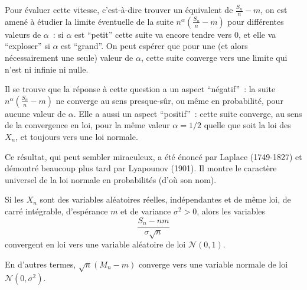 Pour évaluer cette vitesse, c'est-à-dire trouver un équivalent de
\(\frac{S_n}{n} - m\), on est amené à étudier la limite éventuelle de la
suite \(n^\alpha (\frac{S_n}{n} - m)\) pour différentes valeurs de
\(\alpha\)~: si \(\alpha\) est ``petit'' cette suite va encore tendre
vers 0, et elle va ``exploser'' si \(\alpha\) est ``grand''. On peut
espérer que pour une (et alors nécessairement une seule) valeur de
\(\alpha\), cette suite converge vers une limite qui n'est ni infinie ni
nulle.

Il se trouve que la réponse à cette question a un aspect ``négatif''~:
la suite \(n^\alpha (\frac{S_n}{n} - m)\) ne converge au sens
presque-sûr, ou même en probabilité, pour aucune valeur de \(\alpha\).
Elle a aussi un aspect ``positif''~: cette suite converge, au sens de la
convergence en loi, pour la même valeur \(\alpha = 1/2\) quelle que soit
la loi des \(X_n\), et toujours vers une loi normale.

Ce résultat, qui peut sembler miraculeux, a été énoncé par Laplace
(1749-1827) et démontré beaucoup plus tard par Lyapounov (1901). Il
montre le caractère universel de la loi normale en probabilités (d'où
son nom).

\begin{theoreme}\label{IV-TCL}

Si les \(X_n\) sont des variables aléatoires réelles, indépendantes et
de même loi, de carré intégrable, d'espérance \(m\) et de variance
\(\sigma^2 >0\), alors les variables
\[ \frac{S_n -nm}{\sigma \sqrt{n}}\] convergent en loi vers une variable
aléatoire de loi \(\mathcal{N}(0,1)\).

En d'autres termes, \(\sqrt{n}(M_n - m)\) converge vers une variable
normale de loi \(\mathcal{N}(0,\sigma^2)\).
\end{theoreme}

